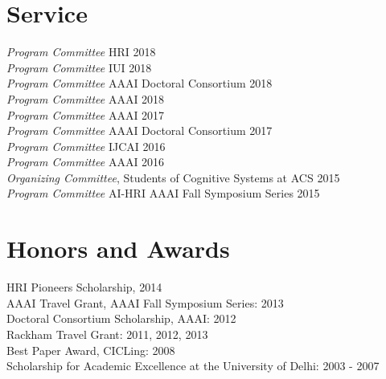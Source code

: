 \documentclass[margin,line,11pt]{res}
\begin{document}
\begin{resume}
                  \section{\sc Service}
                  \emph{Program Committee} HRI \hfill 2018\\
                  \emph{Program Committee} IUI \hfill 2018\\
                  \emph{Program Committee} AAAI Doctoral Consortium \hfill 2018\\
                  \emph{Program Committee} AAAI \hfill 2018\\
                  \emph{Program Committee} AAAI \hfill 2017\\
                  \emph{Program Committee} AAAI Doctoral Consortium \hfill 2017\\
                  \emph{Program Committee} IJCAI \hfill 2016\\
                  \emph{Program Committee} AAAI \hfill 2016\\
                  \emph{Organizing Committee}, Students of Cognitive Systems at ACS \hfill 2015\\
                  \emph{Program Committee} AI-HRI AAAI Fall Symposium Series 2015\\



                  \section{\sc Honors and Awards} 
                  HRI Pioneers Scholarship, 2014\\
                  AAAI Travel Grant, AAAI Fall Symposium Series: 2013\\
                  Doctoral Consortium Scholarship, AAAI: 2012 \\
                  Rackham Travel Grant: 2011, 2012, 2013 \\
                  Best Paper Award, CICLing: 2008 \\
                  Scholarship for Academic Excellence at the University of Delhi: 2003 - 2007 



\end{resume}
\end{document}
